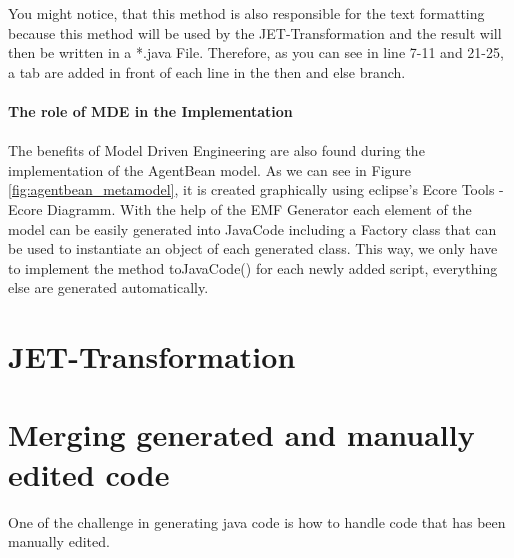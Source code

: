 You might notice, that this method is also responsible for the text formatting because this method will be used by the JET-Transformation and the result will then be written in a *.java File. Therefore, as you can see in line 7-11 and 21-25, a tab are added in front of each line in the then and else branch.\\\\
\textbf{The role of MDE in the Implementation}\\\\
The benefits of Model Driven Engineering are also found during the implementation of the AgentBean model. As we can see in Figure \ref{fig:agentbean_metamodel}, it is created graphically using eclipse's Ecore Tools - Ecore Diagramm. With the help of the EMF Generator each element of the model can be easily generated into JavaCode including a Factory class that can be used to instantiate an object of each generated class. This way, we only have to implement the method toJavaCode() for each newly added script, everything else are generated automatically. 



\section{JET-Transformation}





\section{Merging generated and manually edited code}
One of the challenge in generating java code is how to handle code that has been manually edited.
